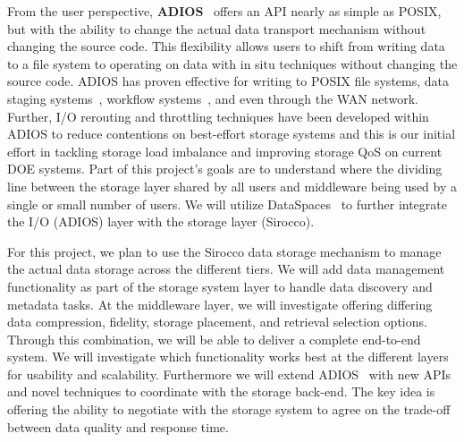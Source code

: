 From the user perspective,
{\bf ADIOS}~\cite{liu_helloadios,lofstead:2009:adaptible} offers an API nearly as simple as POSIX, but with the
ability to change the actual data transport mechanism without changing the
source code. This flexibility allows users to shift from writing data to a file system
to operating on data with in situ techniques without changing the source code.
ADIOS has proven effective for writing to POSIX file
systems, data staging systems~\cite{zheng:2010:predata,docan:2010:dataspaces,oldfield:2006:nessie}, workflow
systems~\cite{Dayal:2014:flexpath}, and even through the WAN network. Further,
I/O rerouting and throttling techniques \cite{liu_hotstorage,liu_helloadios} have been developed 
within ADIOS to reduce contentions on best-effort storage systems and this is our initial
effort in tackling storage load imbalance and improving storage QoS on current DOE systems.
Part of this project's goals are to understand where the dividing line
between the storage layer shared by all users and middleware being used by a
single or small number of users. We will utilize DataSpaces~\cite{docan:2010:dataspaces} to 
further integrate the I/O (ADIOS) layer with the storage layer (Sirocco).
%
% 

For this project, we plan to use the Sirocco data storage mechanism to manage
the actual data storage across the different tiers. We will add data management functionality as part of the storage
system layer to handle data discovery and metadata tasks. At the middleware
layer, we will investigate offering differing data compression, fidelity,
storage placement, and retrieval selection options.  Through this combination,
we will be able to deliver a complete end-to-end system. We will investigate
which functionality works best at the different layers for usability and
scalability. Furthermore we will  extend ADIOS~\cite{lofstead:2009:adaptible} with new APIs and novel
techniques to coordinate with the storage back-end. The key idea is offering
the ability to negotiate with the storage system to agree on the trade-off
between data quality and response time. 

